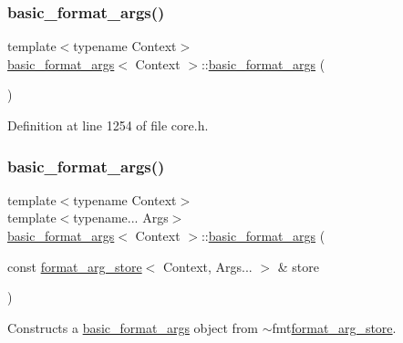 \subsubsection{\texorpdfstring{basic\+\_\+format\+\_\+args()}{basic\_format\_args()}\hspace{0.1cm}{\footnotesize\ttfamily [1/3]}}
{\footnotesize\ttfamily template$<$typename Context$>$ \\
\hyperlink{classbasic__format__args}{basic\+\_\+format\+\_\+args}$<$ Context $>$\+::\hyperlink{classbasic__format__args}{basic\+\_\+format\+\_\+args} (\begin{DoxyParamCaption}{ }\end{DoxyParamCaption})\hspace{0.3cm}{\ttfamily [inline]}}



Definition at line 1254 of file core.\+h.

\mbox{\label{classbasic__format__args_aff6e7b681609f33b18afb00281259ce2}} 
\subsubsection{\texorpdfstring{basic\+\_\+format\+\_\+args()}{basic\_format\_args()}\hspace{0.1cm}{\footnotesize\ttfamily [2/3]}}
{\footnotesize\ttfamily template$<$typename Context$>$ \\
template$<$typename... Args$>$ \\
\hyperlink{classbasic__format__args}{basic\+\_\+format\+\_\+args}$<$ Context $>$\+::\hyperlink{classbasic__format__args}{basic\+\_\+format\+\_\+args} (\begin{DoxyParamCaption}\item[{const \hyperlink{classformat__arg__store}{format\+\_\+arg\+\_\+store}$<$ Context, Args... $>$ \&}]{store }\end{DoxyParamCaption})\hspace{0.3cm}{\ttfamily [inline]}}

Constructs a {\ttfamily \hyperlink{classbasic__format__args}{basic\+\_\+format\+\_\+args}} object from {\ttfamily $\sim$fmt\hyperlink{classformat__arg__store}{format\+\_\+arg\+\_\+store}}.  

